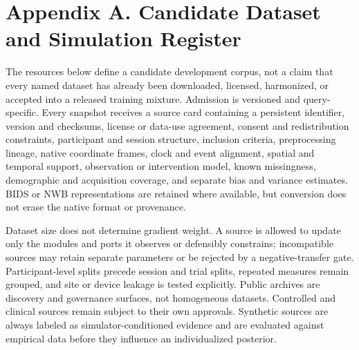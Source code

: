 \clearpage
\onecolumn
\section{Appendix A. Candidate Dataset and Simulation Register}
\newcommand{\sourceurl}[2]{\href{#1}{#2}}

\begin{center}
\begin{minipage}{.82\textwidth}
The resources below define a candidate development corpus, not a claim that
every named dataset has already been downloaded, licensed, harmonized, or
accepted into a released training mixture. Admission is versioned and
query-specific. Every snapshot receives a source card containing a persistent
identifier, version and checksums, license or data-use agreement, consent and
redistribution constraints, participant and session structure, inclusion
criteria, preprocessing lineage, native coordinate frames, clock and event
alignment, spatial and temporal support, observation or intervention model,
known missingness, demographic and acquisition coverage, and separate bias
and variance estimates. BIDS or NWB representations are retained where
available, but conversion does not erase the native format or provenance.

Dataset size does not determine gradient weight. A source is allowed to
update only the modules and ports it observes or defensibly constrains;
incompatible sources may retain separate parameters or be rejected by a
negative-transfer gate. Participant-level splits precede session and trial
splits, repeated measures remain grouped, and site or device leakage is
tested explicitly. Public archives are discovery and governance surfaces,
not homogeneous datasets. Controlled and clinical sources remain subject to
their own approvals. Synthetic sources are always labeled as
simulator-conditioned evidence and are evaluated against empirical data
before they influence an individualized posterior.
\end{minipage}
\end{center}

